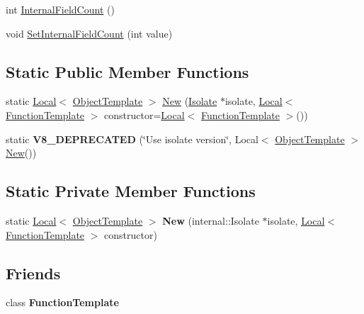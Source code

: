 \begin{DoxyCompactItemize}
\item 
int \hyperlink{classv8_1_1_object_template_a43de785d594d8c01b18230b1aa79e31c}{Internal\+Field\+Count} ()
\item 
void \hyperlink{classv8_1_1_object_template_ab63916ac584a76bca8ba541f86ce9fce}{Set\+Internal\+Field\+Count} (int value)
\end{DoxyCompactItemize}
\subsection*{Static Public Member Functions}
\begin{DoxyCompactItemize}
\item 
static \hyperlink{classv8_1_1_local}{Local}$<$ \hyperlink{classv8_1_1_object_template}{Object\+Template} $>$ \hyperlink{classv8_1_1_object_template_ae0bcd58e9e069c50148c377d774de7a1}{New} (\hyperlink{classv8_1_1_isolate}{Isolate} $\ast$isolate, \hyperlink{classv8_1_1_local}{Local}$<$ \hyperlink{classv8_1_1_function_template}{Function\+Template} $>$ constructor=\hyperlink{classv8_1_1_local}{Local}$<$ \hyperlink{classv8_1_1_function_template}{Function\+Template} $>$())
\item 
static {\bfseries V8\+\_\+\+D\+E\+P\+R\+E\+C\+A\+T\+ED} (\char`\"{}Use isolate version\char`\"{}, Local$<$ \hyperlink{classv8_1_1_object_template}{Object\+Template} $>$ \hyperlink{classv8_1_1_object_template_ae0bcd58e9e069c50148c377d774de7a1}{New}())\hypertarget{classv8_1_1_object_template_aca569a9eafe2f49f8638e0157d1b20a2}{}\label{classv8_1_1_object_template_aca569a9eafe2f49f8638e0157d1b20a2}

\end{DoxyCompactItemize}
\subsection*{Static Private Member Functions}
\begin{DoxyCompactItemize}
\item 
static \hyperlink{classv8_1_1_local}{Local}$<$ \hyperlink{classv8_1_1_object_template}{Object\+Template} $>$ {\bfseries New} (internal\+::\+Isolate $\ast$isolate, \hyperlink{classv8_1_1_local}{Local}$<$ \hyperlink{classv8_1_1_function_template}{Function\+Template} $>$ constructor)\hypertarget{classv8_1_1_object_template_a4b64099953d79208a6c0c9d2e91ec2f8}{}\label{classv8_1_1_object_template_a4b64099953d79208a6c0c9d2e91ec2f8}

\end{DoxyCompactItemize}
\subsection*{Friends}
\begin{DoxyCompactItemize}
\item 
class {\bfseries Function\+Template}\hypertarget{classv8_1_1_object_template_a334168ad1a5f39cf17b818ca3356aacd}{}\label{classv8_1_1_object_template_a334168ad1a5f39cf17b818ca3356aacd}

\end{DoxyCompactItemize}



